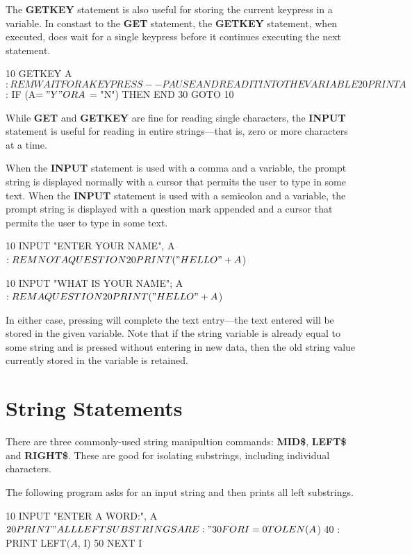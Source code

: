 The {\bf GETKEY} statement is also useful for storing the current keypress in a variable. In constast to the {\bf GET} statement, the {\bf GETKEY} statement, when executed, does wait for a single keypress before it continues executing the next statement.

\begin{screencode}
10 GETKEY A$: REM WAIT FOR A KEYPRESS--PAUSE AND READ IT INTO THE VARIABLE
20 PRINT A$: IF (A$ = "Y" OR A$ = "N") THEN END
30 GOTO 10
\end{screencode}

While {\bf GET} and {\bf GETKEY} are fine for reading single characters, the {\bf INPUT} statement is useful for reading in entire strings---that is, zero or more characters at a time.

When the {\bf INPUT} statement is used with a comma and a variable, the prompt string is displayed normally with a cursor that permits the user to type in some text. When the {\bf INPUT} statement is used with a semicolon and a variable, the prompt string is displayed with a question mark appended and a cursor that permits the user to type in some text.

\begin{screencode}
10 INPUT "ENTER YOUR NAME", A$: REM NOT A QUESTION
20 PRINT ("HELLO " + A$)
\end{screencode}

\begin{screencode}
10 INPUT "WHAT IS YOUR NAME"; A$: REM A QUESTION
20 PRINT ("HELLO " + A$)
\end{screencode}

In either case, pressing  will complete the text entry---the text entered will be stored in the given variable. Note that if the string variable is already equal to some string and  is pressed without entering in new data, then the old string value currently stored in the variable is retained.

\section{String Statements}
There are three commonly-used string manipultion commands: {\bf MID\$}, {\bf LEFT\$} and {\bf RIGHT\$}. These are good for isolating substrings, including individual characters.

The following program asks for an input string and then prints all left substrings.
\begin{screencode}
10 INPUT "ENTER A WORD:", A$
20 PRINT "ALL LEFT SUBSTRINGS ARE:"
30 FOR I = 0 TO LEN(A$)
40 :  PRINT LEFT$(A$, I)
50 NEXT I
\end{screencode}

